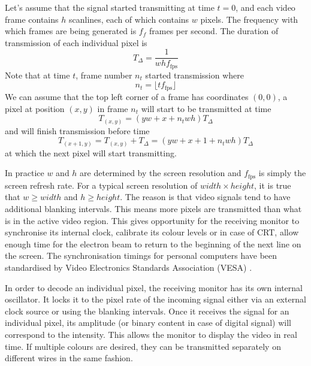 \documentclass[a4paper,12pt,twoside,openright]{report}
\begin{document}
Let's assume that the signal started transmitting at time $t=0$, and each video frame contains $h$ scanlines, each of which contains $w$ pixels. The frequency with which frames are being generated is $f_{f}$ frames per second. The duration of transmission of each individual pixel is \begin{equation}
\label{eq:tdelta_definition}
T_{\Delta}=\frac{1}{w h f_\text{fps}}
\end{equation}
Note that at time $t$, frame number $n_{t}$ started transmission where 
\begin{equation}
n_{t}=\lfloor t f_\text{fps} \rfloor
\end{equation}
We can assume that the top left corner of a frame has coordinates $(0, 0)$, a pixel at position $(x, y)$ in frame $n_{t}$ will start to be transmitted at time
\begin{equation}
T_{(x,y)}= (y w + x + n_{t} w h) T_{\Delta}
\end{equation}
and will finish transmission before time 
\begin{equation}
T_{(x+1,y)} = T_{(x,y)} + T_{\Delta} =(y w + x + 1 + n_{t} w h) T_{\Delta}
\end{equation}
at which the next pixel will start transmitting.

In practice $w$ and $h$ are determined by the screen resolution and $f_\text{fps}$ is simply the screen refresh rate. For a typical screen resolution of $width \times height$, it is true that $w \geq width$ and $h \geq height$. The reason is that video signals tend to have additional blanking intervals. This means more pixels are transmitted than what is in the active video region. This gives opportunity for the receiving monitor to synchronise its internal clock, calibrate its colour levels or in case of CRT, allow enough time for the electron beam to return to the beginning of the next line on the screen. The synchronisation timings for personal computers have been standardised by Video Electronics Standards Association (VESA) \cite{vesa}.

In order to decode an individual pixel, the receiving monitor has its own internal oscillator. It locks it to the pixel rate of the incoming signal either via an external clock source or using the blanking intervals. Once it receives the signal for an individual pixel, its amplitude (or binary content in case of digital signal) will correspond to the intensity. This allows the monitor to display the video in real time. If multiple colours are desired, they can be transmitted separately on different wires in the same fashion.
\end{document}
